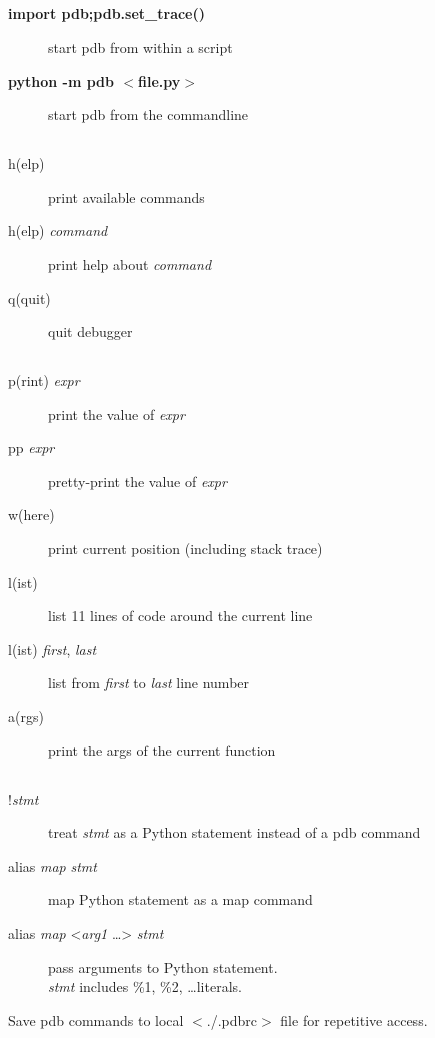\documentclass[10pt,landscape,a4paper]{article}
\newcommand{\keystroke}[1]{$<$#1$>$}
\newcommand{\blacksubsection}[1]{\subsection{\colorbox{black}{\makebox[\linewidth][c]{\textcolor{white}{#1}}}}}
\begin{document}
  \begin{multicols}{3}
    \blacksubsection{Getting started}
      \begin{description}
        \item[{\bfseries import pdb;pdb.set\_trace()}]
             start pdb from within a script
        \item[{\bfseries python -m pdb \keystroke{file.py}}] start pdb from the commandline
      \end{description}

    \blacksubsection{Basics}
      \begin{description}
        \item[h(elp)] print available commands
        \item[h(elp) \textit{command}] print help about \textit{command}
        \item[q(quit)] quit debugger
      \end{description}

    \blacksubsection{Examine}
      \begin{description}
        \item[p(rint) \textit{expr}] print the value of \textit{expr}
        \item[pp \textit{expr}] pretty-print the value of \textit{expr}
        \item[w(here)] print current position (including stack trace)
        \item[l(ist)] list 11 lines of code around the current line
        \item[l(ist) \textit{first}, \textit{last}] list from \textit{first} to \textit{last} line number
        \item[a(rgs)] print the args of the current function
      \end{description}

    \blacksubsection{Miscellaneous}
      \begin{description}
        \item[!\textit{stmt}] treat \textit{stmt} as a Python statement instead of a pdb command
        \item[alias \textit{map} \textit{stmt}] map Python statement as a map command
        \item[alias \textit{map} <\textit{arg1} \ldots> \textit{stmt}] pass arguments to Python statement. \\
            \textit{stmt} includes \%1, \%2, \ldots literals.
      \end{description}
      Save pdb commands to local \keystroke{./.pdbrc} file for repetitive access.


\end{multicols}
\end{document}
